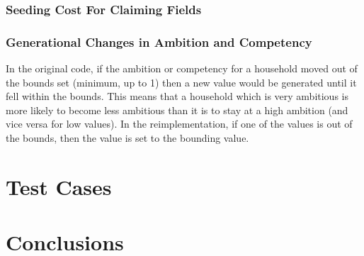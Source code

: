 \documentclass[12pt]{article}
\begin{document}
			\subsubsection{Seeding Cost For Claiming Fields}
				
			\subsubsection{Generational Changes in Ambition and Competency}
				In the original code, if the ambition or competency for a household moved out of the bounds set (minimum, up to 1) then a new value would be generated until it fell within the bounds. This means that a household which is very ambitious is more likely to become less ambitious than it is to stay at a high ambition (and vice versa for low values). In the reimplementation, if one of the values is out of the bounds, then the value is set to the bounding value.
			
	\section{Test Cases}

	\section{Conclusions}
	
	\begin{thebibliography}{9}

	\end{thebibliography}
\end{document}
